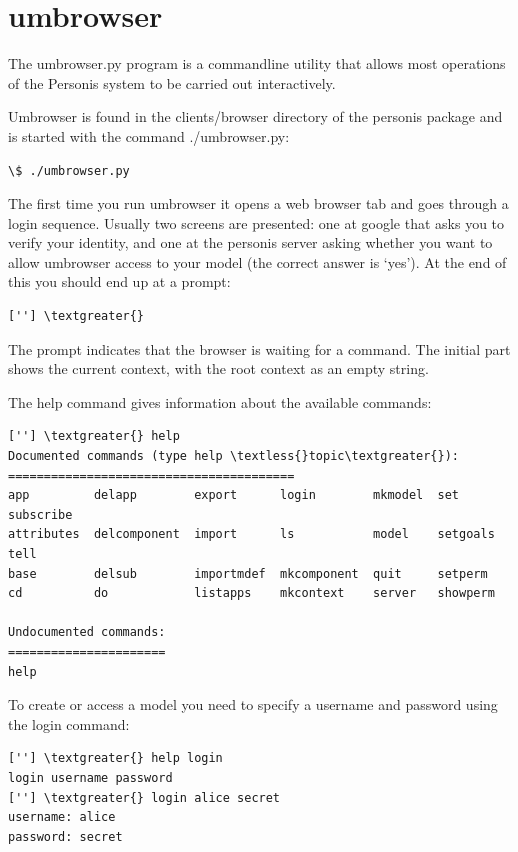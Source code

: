 \documentclass[letterpaper,10pt,english]{sphinxmanual}
\begin{document}
\section{umbrowser}
\label{Tutorial:umbrowser}
The umbrowser.py program is a commandline utility that allows most
operations of the Personis system to be carried out interactively.

Umbrowser is found in the clients/browser directory of the personis package and is started with
the command ./umbrowser.py:

\begin{Verbatim}[commandchars=\\\{\}]
\$ ./umbrowser.py
\end{Verbatim}

The first time you run umbrowser it opens a web browser tab and goes through a login sequence. Usually two screens are presented: one at google that asks you to verify your identity, and one at the personis server asking whether you want to allow umbrowser access to your model (the correct answer is `yes'). At the end of this you should end up at a prompt:

\begin{Verbatim}[commandchars=\\\{\}]
[''] \textgreater{}
\end{Verbatim}

The prompt indicates that the browser is waiting for a command. The
initial part shows the current context, with the root context as an
empty string.

The help command gives information about the available commands:

\begin{Verbatim}[commandchars=\\\{\}]
[''] \textgreater{} help
Documented commands (type help \textless{}topic\textgreater{}):
========================================
app         delapp        export      login        mkmodel  set       subscribe
attributes  delcomponent  import      ls           model    setgoals  tell
base        delsub        importmdef  mkcomponent  quit     setperm
cd          do            listapps    mkcontext    server   showperm

Undocumented commands:
======================
help
\end{Verbatim}

To create or access a model you need to specify a username and password
using the login command:

\begin{Verbatim}[commandchars=\\\{\}]
[''] \textgreater{} help login
login username password
[''] \textgreater{} login alice secret
username: alice
password: secret
\end{Verbatim}
\end{document}
